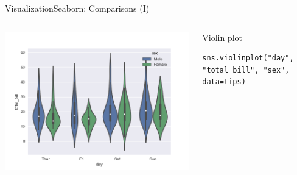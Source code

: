 \documentclass[10pt,compress]{beamer} %
\begin{document}
\begin{frame}[fragile]{Visualization}{Seaborn: Comparisons (I)}
\begin{columns}
	\includegraphics[width=\textwidth]{figs/sns-violin.png}\\
	\begin{exampleblock}{\footnotesize{Violin plot}}
	\vspace{-0.2cm} 
	\begin{lstlisting}[basicstyle=\tiny]
	sns.violinplot("day", "total_bill", "sex", data=tips)
	\end{lstlisting}
	\vspace{-0.2cm} 
	\end{exampleblock}

	\end{columns}
\end{frame}
\end{document}
